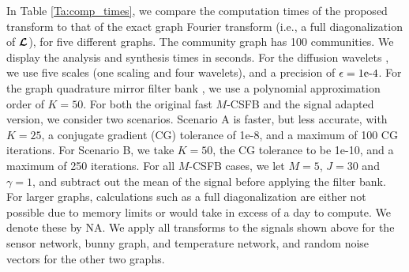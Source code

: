 \documentclass[journal, 10pt]{IEEEtran}
\begin{document}
In Table \ref{Ta:comp_times}, we compare the computation times of the proposed transform to that of the exact graph Fourier transform (i.e., a full diagonalization of $\boldsymbol{\mathcal{L}}$), for five different graphs. The community graph has 100 communities. We display the analysis and synthesis times in seconds. For the diffusion wavelets \cite{coifman2006diffusion}, we use five scales (one scaling and four wavelets), and a precision of $\epsilon=1\hbox{e-4}$. For the graph quadrature mirror filter bank \cite{narang2012perfect}, we use a polynomial approximation order of $K=50$.
For both the original fast $M$-CSFB and the signal adapted version, we consider two scenarios. Scenario A is faster, but less accurate, with $K=25$, a conjugate gradient (CG) tolerance of 1e-8, and a maximum of 100 CG iterations. For Scenario B, we take $K=50$, the CG tolerance to be 1e-10, and a maximum of 250 iterations. For all $M$-CSFB cases, we let $M=5$, $J=30$ and $\gamma=1$, and subtract out the mean of the signal before applying the filter bank. For larger graphs, calculations such as a  full diagonalization are either not possible due to memory limits or would take in excess of a day to compute. We denote these by NA. We apply all transforms to the signals shown above for the sensor network, bunny graph, and temperature network, and random noise vectors for the other two graphs.
\end{document}
